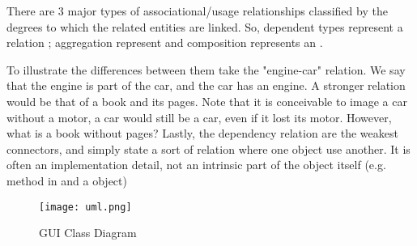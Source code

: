 

	\par{There are 3 major types of associational/usage relationships classified
			by the degrees to which the related entities are linked. So,
			dependent types represent a  relation ;
			aggregation represent  and composition
	represents an .}
	\par{To illustrate the differences between them take the "engine-car"
			relation. We say that the engine is part of the car, and the car has
			an engine. A stronger relation would be that of a book and its
			pages. Note that it is conceivable to image a car without a motor, a
			car would still be a car, even if it lost its motor. However, what
			is a book without pages? Lastly, the dependency relation are the
			weakest connectors, and simply state a sort of relation where
	one object  use another. It is often an implementation detail,
	not an intrinsic part of the object itself (e.g.  method in
	 and a  object)}

	\begin{figure}[H]
			\texttt{[image: uml.png]}
			\caption{GUI Class Diagram \cite{umlVisual}}
	\end{figure}
